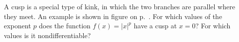 A cusp is a special type of kink, in which the two branches are parallel
       where they meet. An example is shown in figure 
on p.~\pageref{fig:caustic}. For which values of the exponent $p$
does the function $f(x)=|x|^p$ have a cusp at $x=0$? For which values 
is it nondifferentiable?
